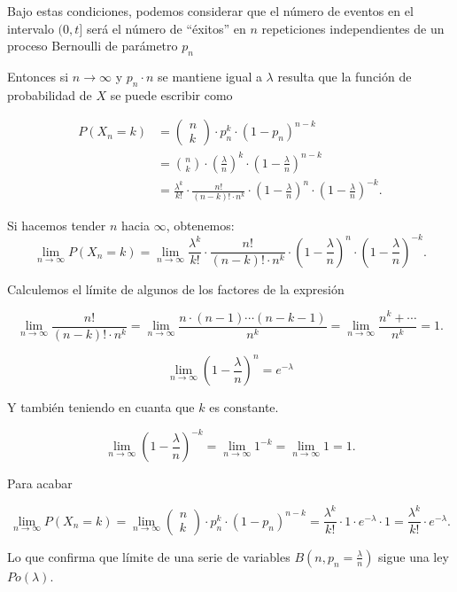 \documentclass[
  letterpaper,
  DIV=11,
  numbers=noendperiod]{scrreprt}
\begin{document}
Bajo estas condiciones, podemos considerar que el número de eventos en
el intervalo \((0,t]\) será el número de ``éxitos'' en \(n\)
repeticiones independientes de un proceso Bernoulli de parámetro \(p_n\)

Entonces si \(n\to\infty\) y \(p_n\cdot n\) se mantiene igual a
\(\lambda\) resulta que la función de probabilidad de \(X\) se puede
escribir como

\[
\begin{array}{rl}
P(X_n=k)&=\left(\begin{array}{c} n\\ k\end{array}\right) \cdot p_n^k\cdot (1-p_n)^{n-k}
\\
&= {n\choose k}\cdot \left(\frac{\lambda}{n}\right)^{k}\cdot \left(1-\frac{\lambda}{n}\right)^{n-k}\\
&=
\frac{\lambda^k}{k!}\cdot\frac{n!}{(n-k)!\cdot n^k}\cdot
\left(1-\frac{\lambda}{n}\right)^{n}\cdot \left(1-\frac{\lambda}{n}\right)^{-k}.
\end{array}
\]

Si hacemos tender \(n\) hacia \(\infty\), obtenemos: \[
\lim_{n\to \infty} P(X_n=k) = \lim_{n\to \infty} \frac{\lambda^k}{k!}\cdot\frac{n!}{(n-k)!\cdot n^k} \cdot
\left(1-\frac{\lambda}{n}\right)^{n}\cdot \left(1-\frac{\lambda}{n}\right)^{-k}.
\]

Calculemos el límite de algunos de los factores de la expresión

\[
\displaystyle\lim_{n\to \infty}\frac{n!}{(n-k)!\cdot n^k}= \lim_{n\to \infty}\frac{n\cdot (n-1)\cdots (n-k-1)}{n^k}
=\lim_{n\to \infty}\frac{n^{k}+\cdots}{n^k}=1.
\]

\[
\lim_{n\to \infty} \left(1-\frac{\lambda}{n}\right)^{n}=e^{-\lambda}
\]

Y también teniendo en cuanta que \(k\) es constante.

\[
\lim_{n\to \infty} \left(1-\frac{\lambda}{n}\right)^{-k}=\lim_{n\to \infty} 1^{-k}=\lim_{n\to \infty} 1=1.
\]

Para acabar

\[
\displaystyle\lim_{n\to\infty} P(X_n=k)=
\lim_{n\to\infty} \left(\begin{array}{c} n\\ k\end{array}\right)
\cdot p_n^k \cdot (1-p_n)^{n-k}= \frac{\lambda^k}{k!}\cdot 1 \cdot e^{-\lambda}\cdot 1=\frac{\lambda^k}{k!}\cdot e^{-\lambda}.
\]

Lo que confirma que límite de una serie de variables
\(B(n,p_n=\frac{\lambda}{n})\) sigue una ley \(Po(\lambda)\).
\end{document}
